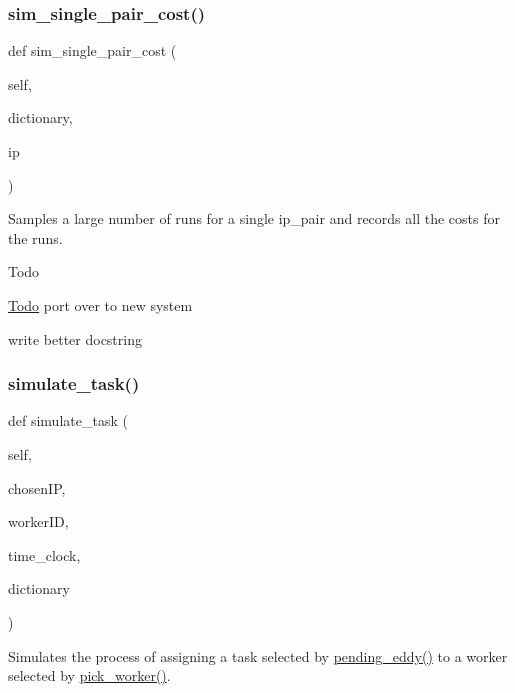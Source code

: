 \subsubsection{\texorpdfstring{sim\+\_\+single\+\_\+pair\+\_\+cost()}{sim\_single\_pair\_cost()}}
{\footnotesize\ttfamily def sim\+\_\+single\+\_\+pair\+\_\+cost (\begin{DoxyParamCaption}\item[{}]{self,  }\item[{}]{dictionary,  }\item[{}]{ip }\end{DoxyParamCaption})}



Samples a large number of runs for a single ip\+\_\+pair and records all the costs for the runs. 

\begin{DoxyRefDesc}{Todo}
\item[\mbox{\hyperlink{todo__todo000004}{Todo}}]port over to new system 

write better docstring \end{DoxyRefDesc}
\mbox{\label{classdynamicfilterapp_1_1test__simulations_1_1_simulation_test_a99876860db527a8dd4dbc844f453e572}} 
\subsubsection{\texorpdfstring{simulate\+\_\+task()}{simulate\_task()}}
{\footnotesize\ttfamily def simulate\+\_\+task (\begin{DoxyParamCaption}\item[{}]{self,  }\item[{}]{chosen\+IP,  }\item[{}]{worker\+ID,  }\item[{}]{time\+\_\+clock,  }\item[{}]{dictionary }\end{DoxyParamCaption})}



Simulates the process of assigning a task selected by \mbox{\hyperlink{namespacedynamicfilterapp_1_1views__helpers_a997e8cb3795ce79c24f95bec20063b13}{pending\+\_\+eddy()}} to a worker selected by \mbox{\hyperlink{classdynamicfilterapp_1_1test__simulations_1_1_simulation_test_acb17139f8e2f7a4b835ec1c05400e8c2}{pick\+\_\+worker()}}. 


